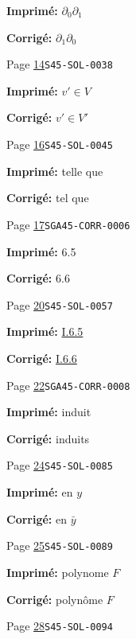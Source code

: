 \begin{description}
\par\noindent\textbf{Imprimé:} \(\partial_0\partial_1\)
\par\noindent\textbf{Corrigé:} \(\partial_1\partial_0\)
\smallskip
\item[\hypertarget{apparatus:FR-0007}{7}] Page \hyperlink{printpage:fr:14}{14}\quad\texttt{S45-SOL-0038}
\par\noindent\textbf{Imprimé:} \(v'\in V\)
\par\noindent\textbf{Corrigé:} \(v'\in V'\)
\smallskip
\item[\hypertarget{apparatus:FR-0008}{8}] Page \hyperlink{printpage:fr:16}{16}\quad\texttt{S45-SOL-0045}
\par\noindent\textbf{Imprimé:} telle que
\par\noindent\textbf{Corrigé:} tel que
\smallskip
\item[\hypertarget{apparatus:FR-0009}{9}] Page \hyperlink{printpage:fr:17}{17}\quad\texttt{SGA45-CORR-0006}
\par\noindent\textbf{Imprimé:} 6.5
\par\noindent\textbf{Corrigé:} 6.6
\smallskip
\item[\hypertarget{apparatus:FR-0010}{10}] Page \hyperlink{printpage:fr:20}{20}\quad\texttt{S45-SOL-0057}
\par\noindent\textbf{Imprimé:} \hyperref[I:1-6-6]{I.6.5}
\par\noindent\textbf{Corrigé:} \hyperref[I:1-6-6]{I.6.6}
\smallskip
\item[\hypertarget{apparatus:FR-0011}{11}] Page \hyperlink{printpage:fr:22}{22}\quad\texttt{SGA45-CORR-0008}
\par\noindent\textbf{Imprimé:} induit
\par\noindent\textbf{Corrigé:} induits
\smallskip
\item[\hypertarget{apparatus:FR-0012}{12}] Page \hyperlink{printpage:fr:24}{24}\quad\texttt{S45-SOL-0085}
\par\noindent\textbf{Imprimé:} en $y$
\par\noindent\textbf{Corrigé:} en $\bar y$
\smallskip
\item[\hypertarget{apparatus:FR-0013}{13}] Page \hyperlink{printpage:fr:25}{25}\quad\texttt{S45-SOL-0089}
\par\noindent\textbf{Imprimé:} polynome $F$
\par\noindent\textbf{Corrigé:} polynôme $F$
\smallskip
\item[\hypertarget{apparatus:FR-0014}{14}] Page \hyperlink{printpage:fr:28}{28}\quad\texttt{S45-SOL-0094}

\end{description}
